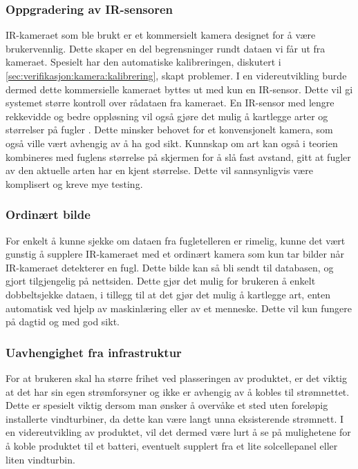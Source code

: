 \subsubsection{Oppgradering av IR-sensoren}\label{sec:videreutvikling:ir-sensor}
IR-kameraet som ble brukt er et kommersielt kamera designet for å være brukervennlig. 
Dette skaper en del begrensninger rundt dataen vi får ut fra kameraet. 
Spesielt har den automatiske kalibreringen, diskutert i \autoref{sec:verifikasjon:kamera:kalibrering}, skapt problemer.  
I en videreutvikling burde dermed dette kommersielle kameraet byttes ut med kun en IR-sensor. 
Dette vil gi systemet større kontroll over rådataen fra kameraet.
En IR-sensor med lengre rekkevidde og bedre oppløsning vil også gjøre det mulig å kartlegge arter og størrelser på fugler \cite{species}. 
Dette minsker behovet for et konvensjonelt kamera, som også ville vært avhengig av å ha god sikt. 
Kunnskap om art kan også i teorien kombineres med fuglens størrelse på skjermen for å slå fast avstand, gitt at fugler av den aktuelle arten har en kjent størrelse. 
Dette vil sannsynligvis være komplisert og kreve mye testing.

\subsubsection{Ordinært bilde}\label{sec:videreutvikling:kamera}
For enkelt å kunne sjekke om dataen fra fugletelleren er rimelig, kunne det vært gunstig å supplere IR-kameraet med et ordinært kamera som kun tar bilder når IR-kameraet detekterer en fugl.
Dette bilde kan så bli sendt til databasen, og gjort tilgjengelig på nettsiden.
Dette gjør det mulig for brukeren å enkelt dobbeltsjekke dataen, i tillegg til at det gjør det mulig å kartlegge art, enten automatisk ved hjelp av maskinlæring eller av et menneske. Dette vil kun fungere på dagtid og med god sikt.

\subsubsection{Uavhengighet fra infrastruktur}\label{sec:videreutvikling:strøm}
For at brukeren skal ha større frihet ved plasseringen av produktet, er det viktig at det har sin egen strømforsyner og ikke er avhengig av å kobles til strømnettet.
Dette er spesielt viktig dersom man ønsker å overvåke et sted uten foreløpig installerte vindturbiner, da dette kan være langt unna eksisterende strømnett.
I en videreutvikling av produktet, vil det dermed være lurt å se på mulighetene for å koble produktet til et batteri, eventuelt supplert fra et lite solcellepanel eller liten vindturbin. 

